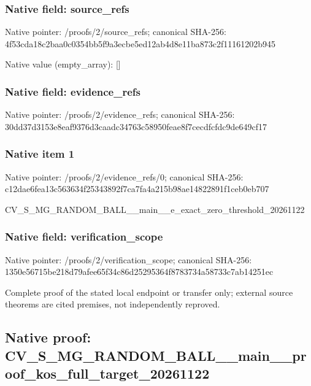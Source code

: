 \documentclass[10pt,a4paper]{article}
\begin{document}
\subsubsection{Native field: source\_refs}


Native pointer: /proofs/2/source\_refs; canonical SHA-256: 4f53cda18c2baa0c0354bb5f\allowbreak{}9a3ecbe5ed12ab4d8e11ba87\allowbreak{}3c2f11161202b945



Native value (empty\_array): []



\subsubsection{Native field: evidence\_refs}


Native pointer: /proofs/2/evidence\_refs; canonical SHA-256: 30dd37d3153e8eaf9376d3ca\allowbreak{}adc34763c58950feae8f7cec\allowbreak{}dfcfdc9de649cf17



\subsubsection{Native item 1}


Native pointer: /proofs/2/evidence\_refs/0; canonical SHA-256: c12dae6fea13c563634f2534\allowbreak{}3892f7ca7fa4a215b98ae148\allowbreak{}22891f1ceb0eb707


CV\_S\_MG\_RANDOM\_BALL\_\_mai\allowbreak{}n\_\_e\_exact\_zero\_threshol\allowbreak{}d\_20261122


\subsubsection{Native field: verification\_scope}


Native pointer: /proofs/2/verification\_scope; canonical SHA-256: 1350e56715be218d79afee65\allowbreak{}f34c86d25295364f8783734a\allowbreak{}58733c7ab14251ec


Complete proof of the stated local endpoint or transfer only; external source theorems are cited premises, not independently reproved.


\subsection{Native proof: CV\_S\_MG\_RANDOM\_BALL\_\_mai\allowbreak{}n\_\_proof\_kos\_full\_target\allowbreak{}\_20261122}
\end{document}
